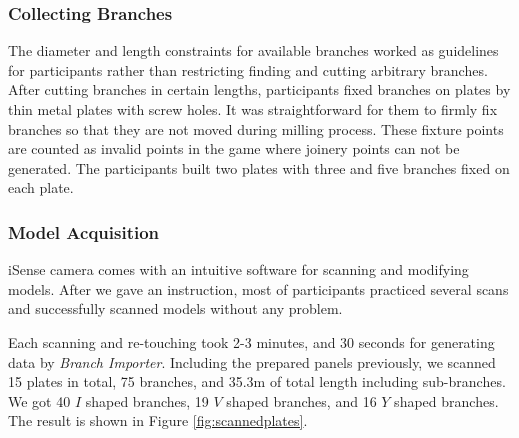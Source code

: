 \subsubsection*{Collecting Branches}
The diameter and length constraints for available branches worked as guidelines for participants rather than restricting finding and cutting arbitrary branches.
After cutting branches in certain lengths, participants fixed branches on plates by thin metal plates with screw holes.
It was straightforward for them to firmly fix branches so that they are not moved during milling process.
These fixture points are counted as invalid points in the game where joinery points can not be generated.
The participants built two plates with three and five branches fixed on each plate.

\subsubsection*{Model Acquisition}
iSense camera comes with an intuitive software for scanning and modifying models.
After we gave an instruction, most of participants practiced several scans and successfully scanned models without any problem.

Each scanning and re-touching took 2-3 minutes, and 30 seconds for generating data by \textit{Branch Importer}.
Including the prepared panels previously, we scanned 15 plates in total, 75 branches, and 35.3m of total length including sub-branches. 
We got 40 $I$ shaped branches, 19 $V$ shaped branches, and 16 $Y$ shaped branches.
The result is shown in Figure \ref{fig:scannedplates}.

